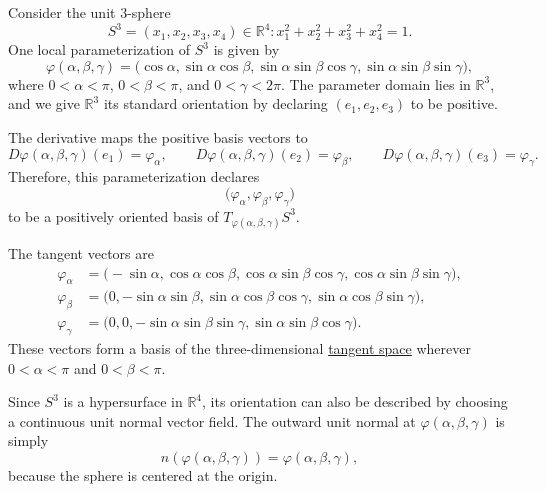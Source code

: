 	\begin{example}
	  \label{ex:orientation-of-the-3-sphere-in-r4}
		Consider the unit $3$-sphere
		\begin{equation}
			S^3 =
			{(x_1,x_2,x_3,x_4) \in \mathbb{R}^4 : x_1^2+x_2^2+x_3^2+x_4^2=1}.
		\end{equation}
		One local parameterization of $S^3$ is given by
		\begin{equation}
			\varphi(\alpha,\beta,\gamma)
			=
			\big(
			\cos\alpha,
			\sin\alpha\cos\beta,
			\sin\alpha\sin\beta\cos\gamma,
			\sin\alpha\sin\beta\sin\gamma
			\big),
		\end{equation}
		where $0<\alpha<\pi$, $0<\beta<\pi$, and $0<\gamma<2\pi$. The parameter domain lies in $\mathbb{R}^3$, and we give $\mathbb{R}^3$ its standard orientation by declaring $(e_1,e_2,e_3)$ to be positive.

The derivative maps the positive basis vectors to
\begin{equation}
D\varphi(\alpha,\beta,\gamma)(e_1)=\varphi_\alpha,
\qquad
D\varphi(\alpha,\beta,\gamma)(e_2)=\varphi_\beta,
\qquad
D\varphi(\alpha,\beta,\gamma)(e_3)=\varphi_\gamma.
\end{equation}
Therefore, this parameterization declares
\begin{equation}
\bigl(\varphi_\alpha,\varphi_\beta,\varphi_\gamma\bigr)
\end{equation}
to be a positively oriented basis of $T_{\varphi(\alpha,\beta,\gamma)}S^3$.

The tangent vectors are
\begin{align}
\varphi_\alpha
&=
\big(
-\sin\alpha,
\cos\alpha\cos\beta,
\cos\alpha\sin\beta\cos\gamma,
\cos\alpha\sin\beta\sin\gamma
\big), \\
\varphi_\beta
&=
\big(
0,
-\sin\alpha\sin\beta,
\sin\alpha\cos\beta\cos\gamma,
\sin\alpha\cos\beta\sin\gamma
\big), \\
\varphi_\gamma
&=
\big(
0,
0,
-\sin\alpha\sin\beta\sin\gamma,
\sin\alpha\sin\beta\cos\gamma
\big).
\end{align}
These vectors form a basis of the three-dimensional \hyperref[def:tangent-space]{tangent space} wherever $0<\alpha<\pi$ and $0<\beta<\pi$.

Since $S^3$ is a hypersurface in $\mathbb{R}^4$, its orientation can also be described by choosing a continuous unit normal vector field. The outward unit normal at $\varphi(\alpha,\beta,\gamma)$ is simply
\begin{equation}
n(\varphi(\alpha,\beta,\gamma))=\varphi(\alpha,\beta,\gamma),
\end{equation}
because the sphere is centered at the origin.


\end{example}

